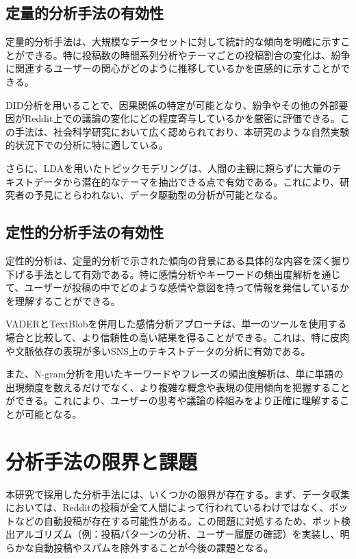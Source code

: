 \documentclass[11pt, a4j]{jreport}
\begin{document}
    \subsection{定量的分析手法の有効性}
    定量的分析手法は、大規模なデータセットに対して統計的な傾向を明確に示すことができる。特に投稿数の時間系列分析やテーマごとの投稿割合の変化は、紛争に関連するユーザーの関心がどのように推移しているかを直感的に示すことができる。

    DID分析を用いることで、因果関係の特定が可能となり、紛争やその他の外部要因がReddit上での議論の変化にどの程度寄与しているかを厳密に評価できる。この手法は、社会科学研究において広く認められており、本研究のような自然実験的状況下での分析に特に適している。

    さらに、LDAを用いたトピックモデリングは、人間の主観に頼らずに大量のテキストデータから潜在的なテーマを抽出できる点で有効である。これにより、研究者の予見にとらわれない、データ駆動型の分析が可能となる。

    \subsection{定性的分析手法の有効性}
    定性的分析は、定量的分析で示された傾向の背景にある具体的な内容を深く掘り下げる手法として有効である。特に感情分析やキーワードの頻出度解析を通じて、ユーザーが投稿の中でどのような感情や意図を持って情報を発信しているかを理解することができる。

    VADERとTextBlobを併用した感情分析アプローチは、単一のツールを使用する場合と比較して、より信頼性の高い結果を得ることができる。これは、特に皮肉や文脈依存の表現が多いSNS上のテキストデータの分析に有効である。

    また、N-gram分析を用いたキーワードやフレーズの頻出度解析は、単に単語の出現頻度を数えるだけでなく、より複雑な概念や表現の使用傾向を把握することができる。これにより、ユーザーの思考や議論の枠組みをより正確に理解することが可能となる。

    \section{分析手法の限界と課題}
    本研究で採用した分析手法には、いくつかの限界が存在する。まず、データ収集においては、Redditの投稿が全て人間によって行われているわけではなく、ボットなどの自動投稿が存在する可能性がある。この問題に対処するため、ボット検出アルゴリズム（例：投稿パターンの分析、ユーザー履歴の確認）を実装し、明らかな自動投稿やスパムを除外することが今後の課題となる。
\end{document}
